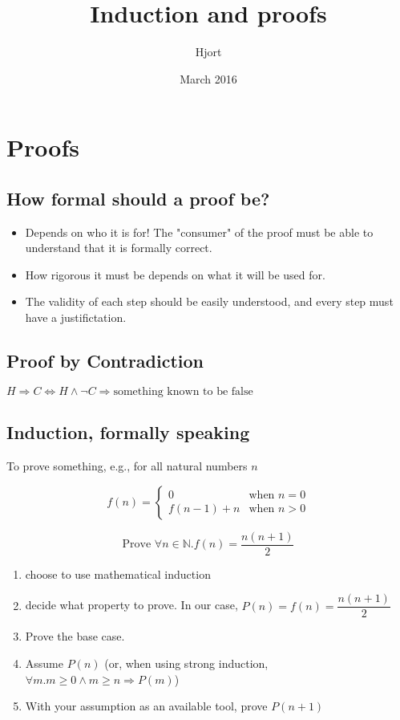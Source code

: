 \documentclass{article}
\title{Induction and proofs}
\date{March 2016}
\author{Hjort}
\begin{document}
\maketitle

\section{Proofs}

\subsection{How formal should a proof be?}

\begin{itemize}
        \item Depends on who it is for! The "consumer" of the proof must be able to understand that it is formally correct.
        \item How rigorous it must be depends on what it will be used for.
        \item The validity of each step should be easily understood, and every step must have a justifictation.
\end{itemize}

\subsection{Proof by Contradiction}

$ H \Rightarrow C \Leftrightarrow H \land \lnot C \Rightarrow \text{something known to be false}$

\subsection{Induction, formally speaking}

To prove something, e.g., for all natural numbers $n$

$$ 
f(n) =
    \begin{cases}
        0 & \text{when } n = 0 \\
        f(n-1) + n & \text{when }n > 0
    \end {cases}
$$

$$
\text{Prove } \forall n \in \mathbb{N} . f(n) = \dfrac{n(n+1)}{2}
$$

\begin{enumerate}
    \item choose to use mathematical induction
    \item decide what property to prove. In our case, $P(n) = f(n) = \dfrac{n(n+1)}{2} $
    \item Prove the base case.
    \item Assume $P(n)$ (or, when using strong induction, $\forall m . m \geq 0 \land m \geq n \Rightarrow P(m) $)
    \item With your assumption as an available tool, prove $P(n+1)$
\end{enumerate}
\end{document}
